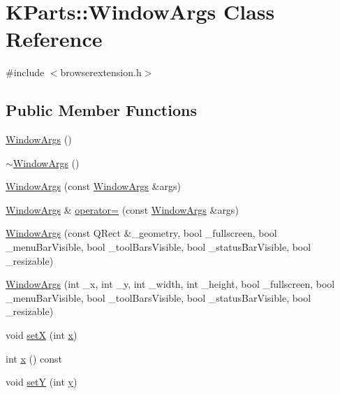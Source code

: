 \hypertarget{classKParts_1_1WindowArgs}{\section{K\+Parts\+:\+:Window\+Args Class Reference}
\label{classKParts_1_1WindowArgs}
}


{\ttfamily \#include $<$browserextension.\+h$>$}

\subsection*{Public Member Functions}
\begin{DoxyCompactItemize}
\item 
\hyperlink{classKParts_1_1WindowArgs_a6ba69542d139ad2d0028217e5ddb3e29}{Window\+Args} ()
\item 
\hyperlink{classKParts_1_1WindowArgs_a3055e556ecc5e135b6e9c79e2d389030}{$\sim$\+Window\+Args} ()
\item 
\hyperlink{classKParts_1_1WindowArgs_a2d5689aada5007fecb06ab424b9e7e29}{Window\+Args} (const \hyperlink{classKParts_1_1WindowArgs}{Window\+Args} \&args)
\item 
\hyperlink{classKParts_1_1WindowArgs}{Window\+Args} \& \hyperlink{classKParts_1_1WindowArgs_ab066d5b00f6d530333741ff962dc7a98}{operator=} (const \hyperlink{classKParts_1_1WindowArgs}{Window\+Args} \&args)
\item 
\hyperlink{classKParts_1_1WindowArgs_a5246d7180dfb422bbae2b0fa42cb7dae}{Window\+Args} (const Q\+Rect \&\+\_\+geometry, bool \+\_\+fullscreen, bool \+\_\+menu\+Bar\+Visible, bool \+\_\+tool\+Bars\+Visible, bool \+\_\+status\+Bar\+Visible, bool \+\_\+resizable)
\item 
\hyperlink{classKParts_1_1WindowArgs_a9a571192e827587dd0592260da03736e}{Window\+Args} (int \+\_\+x, int \+\_\+y, int \+\_\+width, int \+\_\+height, bool \+\_\+fullscreen, bool \+\_\+menu\+Bar\+Visible, bool \+\_\+tool\+Bars\+Visible, bool \+\_\+status\+Bar\+Visible, bool \+\_\+resizable)
\item 
void \hyperlink{classKParts_1_1WindowArgs_a6e2e25bf31a3778e80ad211f10cad269}{set\+X} (int \hyperlink{classKParts_1_1WindowArgs_a671ecb605228581b1b719a9407f4c2be}{x})
\item 
int \hyperlink{classKParts_1_1WindowArgs_a671ecb605228581b1b719a9407f4c2be}{x} () const 
\item 
void \hyperlink{classKParts_1_1WindowArgs_ae3f3e65be412324da1598110ec3273c9}{set\+Y} (int \hyperlink{classKParts_1_1WindowArgs_a3fcb463bb6b6e87fd9cd9fdd55ecd30b}{y})

\end{DoxyCompactItemize}
